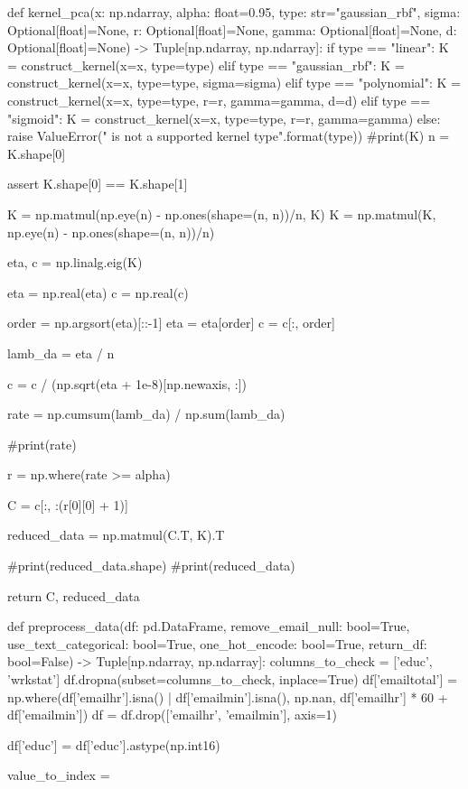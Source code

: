 \begin{python}
    
def kernel_pca(x: np.ndarray, alpha: float=0.95, type: str="gaussian_rbf", sigma: Optional[float]=None, r: Optional[float]=None, gamma: Optional[float]=None, d: Optional[float]=None) -> Tuple[np.ndarray, np.ndarray]:
    if type == "linear":
        K = construct_kernel(x=x, type=type)
    elif type == "gaussian_rbf":
        K = construct_kernel(x=x, type=type, sigma=sigma)
    elif type == "polynomial":
        K = construct_kernel(x=x, type=type, r=r, gamma=gamma, d=d)
    elif type == "sigmoid":
        K = construct_kernel(x=x, type=type, r=r, gamma=gamma)
    else:
        raise ValueError("{} is not a supported kernel type".format(type))
    #print(K)
    n = K.shape[0]

    assert K.shape[0] == K.shape[1]

    K = np.matmul(np.eye(n) - np.ones(shape=(n, n))/n, K)
    K = np.matmul(K, np.eye(n) - np.ones(shape=(n, n))/n)

    eta, c = np.linalg.eig(K)

    eta = np.real(eta)
    c = np.real(c)

    order = np.argsort(eta)[::-1]
    eta = eta[order]
    c = c[:, order]

    lamb_da = eta / n

    c = c / (np.sqrt(eta + 1e-8)[np.newaxis, :])

    rate = np.cumsum(lamb_da) / np.sum(lamb_da)

    #print(rate)

    r = np.where(rate >= alpha)

    C = c[:, :(r[0][0] + 1)]

    reduced_data = np.matmul(C.T, K).T

    #print(reduced_data.shape)
    #print(reduced_data)

    return C, reduced_data


def preprocess_data(df: pd.DataFrame, remove_email_null: bool=True, use_text_categorical: bool=True, one_hot_encode: bool=True, return_df: bool=False) -> Tuple[np.ndarray, np.ndarray]:
    columns_to_check = ['educ', 'wrkstat']
    df.dropna(subset=columns_to_check, inplace=True)
    df['emailtotal'] = np.where(df['emailhr'].isna() | df['emailmin'].isna(), np.nan, df['emailhr'] * 60 + df['emailmin'])
    df = df.drop(['emailhr', 'emailmin'], axis=1)

    df['educ'] = df['educ'].astype(np.int16)
        
    value_to_index = {}


\end{python}
